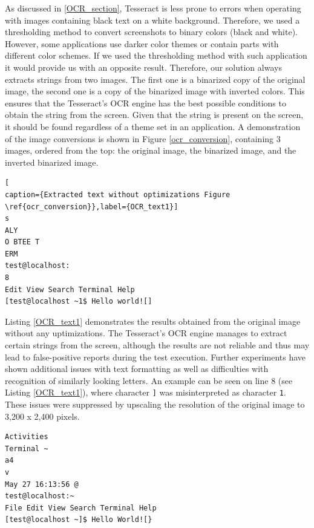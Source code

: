 As discussed in \ref{OCR_section}, Tesseract is less prone to errors when operating with images containing black text on a white background. Therefore, we used a thresholding method to convert screenshots to binary colors (black and white). However, some applications use darker color themes or contain parts with different color schemes. If we used the thresholding method with such application it would provide us with an opposite result. Therefore, our solution always extracts strings from two images. The first one is a binarized copy of the original image, the second one is a copy of the binarized image with inverted colors. This ensures that the Tesseract's OCR engine has the best possible conditions to obtain the string from the screen. Given that the string is present on the screen, it should be found regardless of a theme set in an application. A demonstration of the image conversions is shown in Figure \ref{ocr_conversion}, containing 3 images, ordered from the top: the original image, the binarized image, and the inverted binarized image. 

\begin{minipage}{\linewidth}
\begin{lstlisting}[
caption={Extracted text without optimizations Figure \ref{ocr_conversion}},label={OCR_text1}]
s
ALY
O BTEE T
ERM
test@localhost:
8
Edit View Search Terminal Help
[test@localhost ~1$ Hello world![]
\end{lstlisting}
\end{minipage}

Listing \ref{OCR_text1} demonstrates the results obtained from the original image without any uptimizations. The Tesseract's OCR engine manages to extract certain strings from the screen, although the results are not reliable and thus may lead to false-positive reports during the test execution. Further experiments have shown additional issues with text formatting as well as difficulties with recognition of similarly looking letters. An example can be seen on line 8 (see Listing \ref{OCR_text1}), where character \texttt{]} was misinterpreted as character \texttt{1}. These issues were suppressed by upscaling the resolution of the original image to 3,200 x 2,400 pixels.

\begin{lstlisting}[caption={Extracted text with optimizations},label={OCR_text2}]
Activities
Terminal ~
a4
v
May 27 16:13:56 @
test@localhost:~
File Edit View Search Terminal Help
[test@localhost ~]$ Hello World![}
\end{lstlisting}

